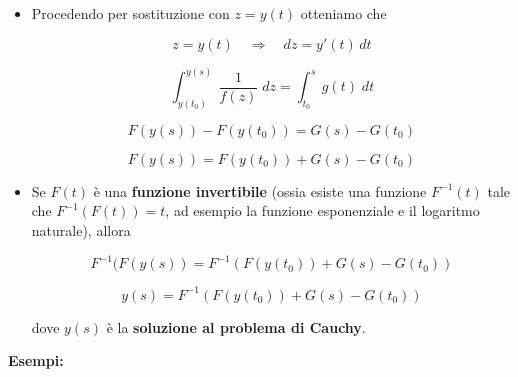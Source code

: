 \documentclass[a4paper, 12pt]{report}
\begin{document}
\begin{itemize}
\begin{itemize}
            \item Procedendo per sostituzione con $z = y(t)$ otteniamo che
            
            \[ z = y(t) \quad \Longrightarrow \quad dz = y'(t) \, dt\]
            
            \[ \int_{y(t_0)}^{y(s)} \frac{1}{f(z)} \; dz = \int_{t_0}^{s} g(t) \; dt\]
            
            \[ F(y(s)) - F(y(t_0)) = G(s) - G(t_0)\]
            
            \[ F(y(s)) = F(y(t_0)) + G(s) - G(t_0)\]
            
            \newpage
            
            \item Se $F(t)$ è una \textbf{funzione invertibile} (ossia esiste una funzione $F^{-1}(t)$ tale che $F^{-1}(F(t)) = t$, ad esempio la funzione esponenziale e il logaritmo naturale), allora
            
            \[ F^{-1}(F(y(s)) = F^{-1}(F(y(t_0)) + G(s) - G(t_0))\]
            
            \[ y(s) = F^{-1}(F(y(t_0)) + G(s) - G(t_0))\]
            
            dove $y(s)$ è la \textbf{soluzione al problema di Cauchy}.
        \end{itemize}
    \end{itemize}
    
    \quad
    
    \textbf{Esempi:}
    
\end{document}
